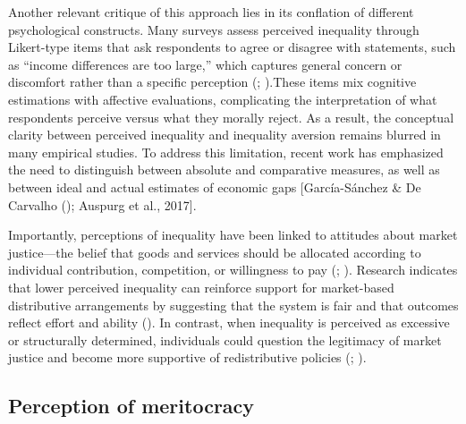 \documentclass[
  12pt,
]{article}
\begin{document}
Another relevant critique of this approach lies in its conflation of
different psychological constructs. Many surveys assess perceived
inequality through Likert-type items that ask respondents to agree or
disagree with statements, such as ``income differences are too large,''
which captures general concern or discomfort rather than a specific
perception (;
).These items mix cognitive estimations with affective evaluations,
complicating the interpretation of what respondents perceive versus what
they morally reject. As a result, the conceptual clarity between
perceived inequality and inequality aversion remains blurred in many
empirical studies. To address this limitation, recent work has
emphasized the need to distinguish between absolute and comparative
measures, as well as between ideal and actual estimates of economic gaps
{[}García-Sánchez \& De Carvalho
(); Auspurg et al.,
2017{]}.

Importantly, perceptions of inequality have been linked to attitudes
about market justice---the belief that goods and services should be
allocated according to individual contribution, competition, or
willingness to pay (; ). Research
indicates that lower perceived inequality can reinforce support for
market-based distributive arrangements by suggesting that the system is
fair and that outcomes reflect effort and ability
(). In contrast, when inequality
is perceived as excessive or structurally determined, individuals could
question the legitimacy of market justice and become more supportive of
redistributive policies
(;
).

\subsection{Perception of meritocracy}\label{perception-of-meritocracy}
\end{document}
